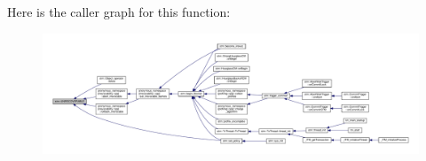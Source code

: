 Here is the caller graph for this function\-:
\nopagebreak
\begin{figure}[H]
\begin{center}
\leavevmode
\includegraphics[width=350pt]{namespacestm_a51b2c0958e7709b39500d037648c461b_icgraph}
\end{center}
\end{figure}




